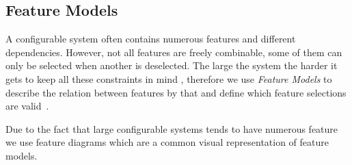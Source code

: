 \subsection{Feature Models}\label{ch:Feature-Model}

A configurable system often contains numerous features and different dependencies.
However, not all features are freely combinable, some of them can only be selected when another is deselected. 
The large the system the harder it gets to keep all these constraints in mind \cite{Feature-Oriented-Software-Product-Lines}, 
therefore we use \emph{Feature Models}
to describe the relation between features by that and define which feature selections are valid~\cite{Feature-Oriented-Software-Product-Lines}.

Due to the fact that large configurable systems tends to have numerous feature we use feature diagrams which are a common
visual representation of feature models.